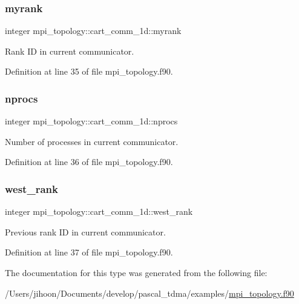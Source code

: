 \subsubsection{\texorpdfstring{myrank}{myrank}}
{\footnotesize\ttfamily integer mpi\+\_\+topology\+::cart\+\_\+comm\+\_\+1d\+::myrank}



Rank ID in current communicator. 



Definition at line 35 of file mpi\+\_\+topology.\+f90.

\mbox{\label{structmpi__topology_1_1cart__comm__1d_adf78d1be6ca59cada6cc444edde4c3fc}} 
\subsubsection{\texorpdfstring{nprocs}{nprocs}}
{\footnotesize\ttfamily integer mpi\+\_\+topology\+::cart\+\_\+comm\+\_\+1d\+::nprocs}



Number of processes in current communicator. 



Definition at line 36 of file mpi\+\_\+topology.\+f90.

\mbox{\label{structmpi__topology_1_1cart__comm__1d_a63baa1f74126ffda0b67af1c487dcd45}} 
\subsubsection{\texorpdfstring{west\_rank}{west\_rank}}
{\footnotesize\ttfamily integer mpi\+\_\+topology\+::cart\+\_\+comm\+\_\+1d\+::west\+\_\+rank}



Previous rank ID in current communicator. 



Definition at line 37 of file mpi\+\_\+topology.\+f90.



The documentation for this type was generated from the following file\+:\begin{DoxyCompactItemize}
\item 
/\+Users/jihoon/\+Documents/develop/pascal\+\_\+tdma/examples/\mbox{\hyperlink{mpi__topology_8f90}{mpi\+\_\+topology.\+f90}}\end{DoxyCompactItemize}
